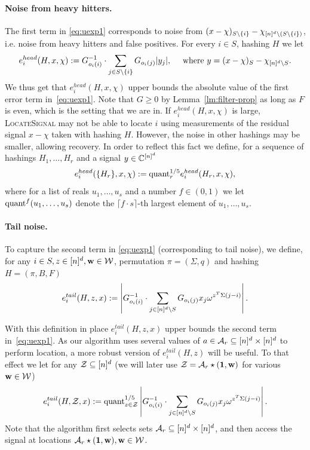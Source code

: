 \paragraph{Noise from heavy hitters.} The first term in \eqref{eq:uexp1} corresponds to noise from $(x-\chi)_{S\setminus \{i\}}-\chi_{{[n]^d}\setminus (S\setminus \{i\})}$, i.e. noise from heavy hitters and false positives. For every $i\in S$, hashing $H$  we let
\begin{equation}\label{eq:eh-pi}
e^{head}_{i}(H, x, \chi):=G_{o_i(i)}^{-1}\cdot \sum_{j\in S\setminus \{i\}} G_{o_i(j)} |y_j|,\text{~~~~where~}y=(x-\chi)_{S}-\chi_{{[n]^d}\setminus S}.\\
\end{equation}
We thus get that $e^{head}_i(H, x, \chi)$ upper bounds the absolute value of the first error term in~\eqref{eq:uexp1}. Note that $G\geq 0$ by Lemma~\ref{lm:filter-prop} as long as $F$ is even, which is the setting that we are in. If $e^{head}_{i}(H, x, \chi)$ is large, \textsc{LocateSignal} may not be able to locate $i$ using measurements of the residual signal $x-\chi$ taken with hashing $H$. However, the noise in other hashings may be smaller, allowing recovery. In order to reflect this fact we define, for a sequence of hashings $H_1,\ldots, H_r$ and a signal $y\in \mathbb{C}^{[n]^d}$
\begin{equation}\label{eq:eh}
e^{head}_{i}(\{H_r\}, x, \chi):=\text{quant}^{1/5}_r e^{head}_i(H_r, x, \chi),
\end{equation}
where for a list of reals $u_1,\ldots, u_s$ and a number $f\in (0, 1)$ we let $\text{quant}^{f}(u_1,\ldots, u_s)$ denote the $\lceil f \cdot s\rceil$-th largest element of $u_1,\ldots, u_s$.  

\paragraph{Tail noise.} To capture the second term in \eqref{eq:uexp1} (corresponding to tail noise), we define, for any $i\in S, z\in {[n]^d}, \mathbf{w}\in \mathcal{W}$, permutation $\pi=(\Sigma, q)$ and hashing $H=(\pi, B, F)$
\begin{equation}\label{eq:et-pi}
e^{tail}_i(H, z, x):=\left|G_{o_i(i)}^{-1}\cdot \sum_{j\in {[n]^d}\setminus S} G_{o_i(j)}x_j \omega^{z^T \Sigma (j-i)}\right|.
\end{equation}

With this definition in place $e^{tail}_i(H, z, x)$ upper bounds the second term in~\eqref{eq:uexp1}. As our algorithm uses several values of $a\in {\mathcal{A}}_r\subseteq {[n]^d}\times {[n]^d}$ to perform location, a more robust version of $e^{tail}_i(H, z)$ will be useful. To that effect we let for any $\mathcal{Z}\subseteq {[n]^d}$ (we will later use $\mathcal{Z}={\mathcal{A}}_r\star (\mathbf{1}, \mathbf{w})$ for various $\mathbf{w}\in \mathcal{W}$)
\begin{equation}\label{eq:et-pi-a-h}
e^{tail}_i(H, \mathcal{Z}, x):=\text{quant}^{1/5}_{z\in \mathcal{Z}} \left|G_{o_i(i)}^{-1}\cdot \sum_{j\in {[n]^d}\setminus S} G_{o_i(j)}x_j \omega^{z^T \Sigma (j-i)}\right|.
\end{equation}
Note that the algorithm first selects sets ${\mathcal{A}}_r\subseteq {[n]^d}\times {[n]^d}$, and then access the signal at locations ${\mathcal{A}}_r\star (\mathbf{1}, \mathbf{w}), \mathbf{w}\in \mathcal{W}$.

